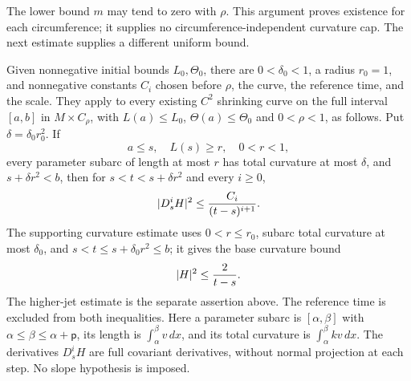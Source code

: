 The lower bound $m$ may tend to zero with $\rho$.  This argument proves
existence for each circumference; it supplies no circumference-independent
curvature cap.  The next estimate supplies a different uniform bound.

\begin{theorem}
\label{thm:ramps-uniform-jets}
Given nonnegative initial bounds $L_0,\Theta_0$, there are
$0<\delta_0<1$, a radius $r_0=1$, and nonnegative constants $C_i$ chosen
before $\rho$, the curve, the reference time, and the scale.  They apply to
every existing $C^2$ shrinking curve on the full interval $[a,b]$ in
$M\times C_\rho$, with $L(a)\leq L_0$, $\Theta(a)\leq\Theta_0$ and
$0<\rho<1$, as follows.  Put $\delta=\delta_0r_0^2$.  If
\[
 a\leq s,\quad L(s)\geq r,\quad 0<r<1,
\]
every parameter subarc of length at most $r$ has total curvature at most
$\delta$, and $s+\delta r^2<b$, then for $s<t<s+\delta r^2$ and every
$i\geq0$,
\[
 |D_s^iH|^2\leq {C_i\over(t-s)^{i+1}}.
\]
The supporting curvature estimate uses $0<r\leq r_0$, subarc total curvature
at most $\delta_0$, and $s<t\leq s+\delta_0r^2\leq b$; it gives the base
curvature bound
\[
 |H|^2\leq {2\over t-s}.
\]
The higher-jet estimate is the separate assertion above.  The reference time
is excluded from both inequalities.  Here a parameter subarc is
$[\alpha,\beta]$ with $\alpha\leq\beta\leq\alpha+\mathsf p$, its length
is $\int_\alpha^\beta v\,dx$, and its total curvature is
$\int_\alpha^\beta kv\,dx$.  The derivatives $D_s^iH$ are full covariant
derivatives, without normal projection at each step.  No slope hypothesis
is imposed.
\end{theorem}
